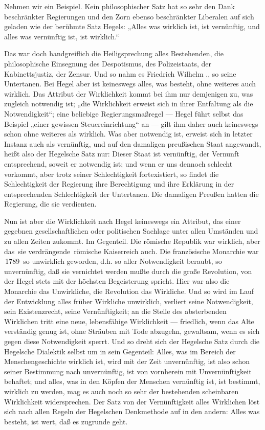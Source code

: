 Nehmen wir ein Beispiel. Kein philosophischer Satz hat so sehr
den Dank beschränkter Regierungen und den Zorn ebenso beschränkter
Liberalen auf sich geladen wie der berühmte Satz Hegels: „Alles was
wirklich ist, ist vernünftig, und alles was vernünftig ist, ist
wirklich.``

Das war doch handgreiflich die Heiligsprechung alles
Bestehenden, die philosophische Einsegnung des Despotismus, des
Polizeistaats, der Kabinettsjustiz, der Zensur. Und so nahm es Friedrich
Wilhelm ., so seine Untertanen. Bei Hegel aber ist keineswegs alles,
was besteht, ohne weiteres auch wirklich. Das Attribut der Wirklichkeit
kommt bei ihm nur demjenigen zu, was zugleich notwendig ist; „die
Wirklichkeit erweist sich in ihrer Entfaltung als die Notwendigkeit``;
eine beliebige Regierungsmaßregel --- Hegel führt selbst das Beispiel
„einer gewissen Steuereinrichtung`` an --- gilt ihm daher auch keineswegs
schon ohne weiteres als wirklich. Was aber notwendig ist, erweist sich
in letzter Instanz auch als vernünftig, und auf den damaligen
preußischen Staat angewandt, heißt also der Hegelsche Satz nur: Dieser
Staat ist vernünftig, der Vernunft entsprechend, soweit er notwendig
ist; und wenn er uns dennoch schlecht vorkommt, aber trotz seiner
Schlechtigkeit fortexistiert, so findet die Schlechtigkeit der Regierung
ihre Berechtigung und ihre Erklärung in der entsprechenden
Schlechtigkeit der Untertanen. Die damaligen Preußen hatten die
Regierung, die sie verdienten.

Nun ist aber die Wirklichkeit nach Hegel keineswegs ein
Attribut, das einer gegebnen gesellschaftlichen oder politischen
Sachlage unter allen Umständen und zu allen Zeiten zukommt. Im
Gegenteil. Die römische Republik war wirklich, aber das \textbar{}\,sie
verdrängende\,\textbar{} römische Kaiserreich auch. Die französische Monarchie war
\textbar{}\,1789\,\textbar{} so unwirklich geworden, d.h. so aller Notwendigkeit beraubt, so
unvernünftig, daß sie vernichtet werden mußte durch die große
Revolution, von der Hegel stets mit der höchsten Begeisterung spricht.
Hier war also die Monarchie das Unwirkliche, die Revolution das
Wirkliche. Und so wird im Lauf der Entwicklung alles früher Wirkliche
unwirklich, verliert seine Notwendigkeit, sein Existenzrecht, seine
Vernünftigkeit; an die Stelle des absterbenden Wirklichen tritt eine
neue, lebensfähige Wirklichkeit --- friedlich, wenn das Alte verständig
genug ist, ohne Sträuben mit Tode abzugehn, gewaltsam, wenn es sich
gegen diese Notwendigkeit sperrt. Und so dreht sich der Hegelsche Satz
durch die Hegelsche Dialektik selbst um in sein Gegenteil: Alles, was im
Bereich der Menschengeschichte wirklich ist, wird mit der Zeit
unvernünftig, ist also schon seiner Bestimmung nach unvernünftig, ist
von vornherein mit Unvernünftigkeit behaftet; und alles, was in den
Köpfen der Menschen vernünftig ist, ist bestimmt, wirklich zu werden,
mag es auch noch so sehr der bestehenden scheinbaren Wirklichkeit
widersprechen. Der Satz von der Vernünftigkeit alles Wirklichen löst
sich nach allen Regeln der Hegelschen Denkmethode auf in den andern:
Alles was besteht, ist wert, daß es zugrunde geht.

